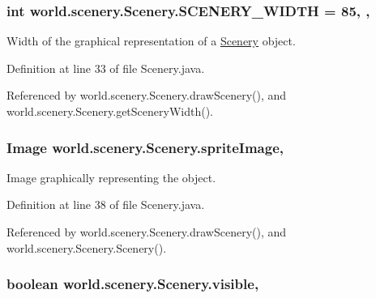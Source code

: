 \hypertarget{a00024_affb047c028883c6d069a03ef0f1caeb8}{
\subsubsection[{S\-C\-E\-N\-E\-R\-Y\-\_\-\-W\-I\-D\-T\-H}]{\setlength{\rightskip}{0pt plus 5cm}int world.\-scenery.\-Scenery.\-S\-C\-E\-N\-E\-R\-Y\-\_\-\-W\-I\-D\-T\-H = 85\hspace{0.3cm}{\ttfamily [static]}, {\ttfamily [protected]}, {\ttfamily [inherited]}}}\label{a00024_affb047c028883c6d069a03ef0f1caeb8}


Width of the graphical representation of a \hyperlink{a00024}{Scenery} object. 



Definition at line 33 of file Scenery.\-java.



Referenced by world.\-scenery.\-Scenery.\-draw\-Scenery(), and world.\-scenery.\-Scenery.\-get\-Scenery\-Width().

\hypertarget{a00024_a512d9c0a154e6843389e343d80843326}{
\subsubsection[{sprite\-Image}]{\setlength{\rightskip}{0pt plus 5cm}Image world.\-scenery.\-Scenery.\-sprite\-Image\hspace{0.3cm}{\ttfamily [protected]}, {\ttfamily [inherited]}}}\label{a00024_a512d9c0a154e6843389e343d80843326}


Image graphically representing the object. 



Definition at line 38 of file Scenery.\-java.



Referenced by world.\-scenery.\-Scenery.\-draw\-Scenery(), and world.\-scenery.\-Scenery.\-Scenery().

\hypertarget{a00024_a7b22a78d3126c947b7010fdbbea02218}{
\subsubsection[{visible}]{\setlength{\rightskip}{0pt plus 5cm}boolean world.\-scenery.\-Scenery.\-visible\hspace{0.3cm}{\ttfamily [protected]}, {\ttfamily [inherited]}}}\label{a00024_a7b22a78d3126c947b7010fdbbea02218}


